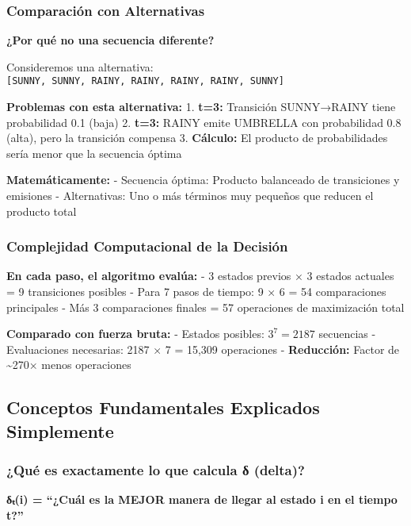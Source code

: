 \documentclass[
]{article}
\begin{document}
\subsubsection{Comparación con
Alternativas}\label{comparaciuxf3n-con-alternativas}

\textbf{¿Por qué no una secuencia diferente?}

Consideremos una alternativa:
\texttt{{[}SUNNY,\ SUNNY,\ RAINY,\ RAINY,\ RAINY,\ RAINY,\ SUNNY{]}}

\textbf{Problemas con esta alternativa:} 1. \textbf{t=3:} Transición
SUNNY→RAINY tiene probabilidad 0.1 (baja) 2. \textbf{t=3:} RAINY emite
UMBRELLA con probabilidad 0.8 (alta), pero la transición compensa 3.
\textbf{Cálculo:} El producto de probabilidades sería menor que la
secuencia óptima

\textbf{Matemáticamente:} - Secuencia óptima: Producto balanceado de
transiciones y emisiones - Alternativas: Uno o más términos muy pequeños
que reducen el producto total

\subsubsection{Complejidad Computacional de la
Decisión}\label{complejidad-computacional-de-la-decisiuxf3n}

\textbf{En cada paso, el algoritmo evalúa:} - 3 estados previos × 3
estados actuales = 9 transiciones posibles - Para 7 pasos de tiempo: 9 ×
6 = 54 comparaciones principales - Más 3 comparaciones finales = 57
operaciones de maximización total

\textbf{Comparado con fuerza bruta:} - Estados posibles: \(3^7 = 2187\)
secuencias - Evaluaciones necesarias: 2187 × 7 = 15,309 operaciones -
\textbf{Reducción:} Factor de \textasciitilde270× menos operaciones

\subsection{Conceptos Fundamentales Explicados
Simplemente}\label{conceptos-fundamentales-explicados-simplemente}

\subsubsection{¿Qué es exactamente lo que calcula δ
(delta)?}\label{quuxe9-es-exactamente-lo-que-calcula-ux3b4-delta}

\textbf{δₜ(i) = ``¿Cuál es la MEJOR manera de llegar al estado i en el
tiempo t?''}
\end{document}
